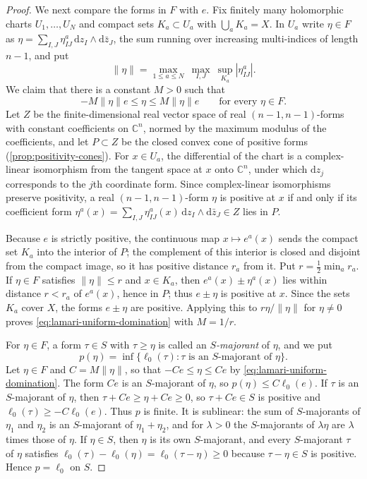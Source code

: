 \begin{proof}
We next compare the forms in $F$ with $e$. Fix finitely many holomorphic charts $U_1,\ldots,U_N$ and compact sets $K_a\subset U_a$ with $\bigcup_aK_a=X$. In $U_a$ write $\eta\in F$ as $\eta=\sum_{I,J}\eta^a_{IJ}\,\mathrm dz_I\wedge\mathrm d\bar z_J$, the sum running over increasing multi-indices of length $n-1$, and put
\[
 \|\eta\|=\max_{1\leq a\leq N}\ \max_{I,J}\ \sup_{K_a}|\eta^a_{IJ}|.
\]
We claim that there is a constant $M>0$ such that
\begin{equation}\label{eq:lamari-uniform-domination}
 -M\|\eta\|e\leq\eta\leq M\|\eta\|e\qquad\text{for every }\eta\in F.
\end{equation}
Let $Z$ be the finite-dimensional real vector space of real $(n-1,n-1)$-forms with constant coefficients on $\mathbb C^n$, normed by the maximum modulus of the coefficients, and let $P\subset Z$ be the closed convex cone of positive forms (\cref{prop:positivity-cones}). For $x\in U_a$, the differential of the chart is a complex-linear isomorphism from the tangent space at $x$ onto $\mathbb C^n$, under which $\mathrm dz_j$ corresponds to the $j$th coordinate form. Since complex-linear isomorphisms preserve positivity, a real $(n-1,n-1)$-form $\eta$ is positive at $x$ if and only if its coefficient form $\eta^a(x)=\sum_{I,J}\eta^a_{IJ}(x)\,\mathrm dz_I\wedge\mathrm d\bar z_J\in Z$ lies in $P$.

Because $e$ is strictly positive, the continuous map $x\mapsto e^a(x)$ sends the compact set $K_a$ into the interior of $P$; the complement of this interior is closed and disjoint from the compact image, so it has positive distance $r_a$ from it. Put $r=\frac12\min_ar_a$. If $\eta\in F$ satisfies $\|\eta\|\leq r$ and $x\in K_a$, then $e^a(x)\pm\eta^a(x)$ lies within distance $r<r_a$ of $e^a(x)$, hence in $P$; thus $e\pm\eta$ is positive at $x$. Since the sets $K_a$ cover $X$, the forms $e\pm\eta$ are positive. Applying this to $r\eta/\|\eta\|$ for $\eta\neq0$ proves \eqref{eq:lamari-uniform-domination} with $M=1/r$.

For $\eta\in F$, a form $\tau\in S$ with $\tau\geq\eta$ is called an \emph{$S$-majorant} of $\eta$, and we put
\[
 p(\eta)=\inf\{\ell_0(\tau):\tau\text{ is an $S$-majorant of }\eta\}.
\]
Let $\eta\in F$ and $C=M\|\eta\|$, so that $-Ce\leq\eta\leq Ce$ by \eqref{eq:lamari-uniform-domination}. The form $Ce$ is an $S$-majorant of $\eta$, so $p(\eta)\leq C\ell_0(e)$. If $\tau$ is an $S$-majorant of $\eta$, then $\tau+Ce\geq\eta+Ce\geq0$, so $\tau+Ce\in S$ is positive and $\ell_0(\tau)\geq-C\ell_0(e)$. Thus $p$ is finite. It is sublinear: the sum of $S$-majorants of $\eta_1$ and $\eta_2$ is an $S$-majorant of $\eta_1+\eta_2$, and for $\lambda>0$ the $S$-majorants of $\lambda\eta$ are $\lambda$ times those of $\eta$. If $\eta\in S$, then $\eta$ is its own $S$-majorant, and every $S$-majorant $\tau$ of $\eta$ satisfies $\ell_0(\tau)-\ell_0(\eta)=\ell_0(\tau-\eta)\geq0$ because $\tau-\eta\in S$ is positive. Hence $p=\ell_0$ on $S$.


\end{proof}
